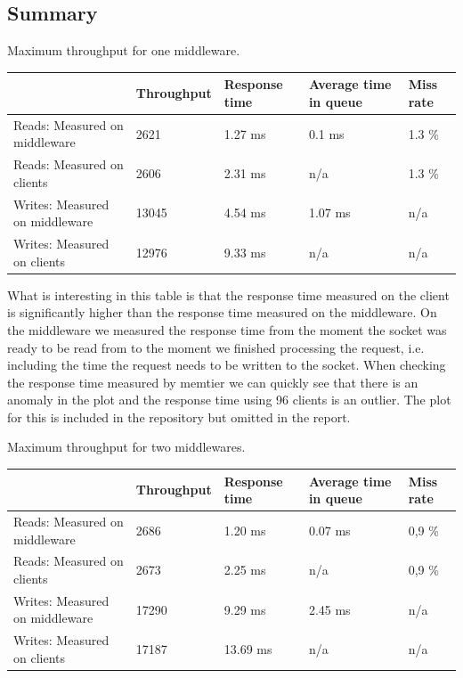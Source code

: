 \documentclass[11pt,a4paper]{article}
\begin{document}
\subsection{Summary}
%
\begin{center}
	{Maximum throughput for one middleware.}
	\begin{tabular}{|l|p{2cm}|p{2cm}|p{2cm}|p{2cm}|}
		\hline                                & Throughput & Response time & Average time in queue & Miss rate \\ 
		\hline Reads: Measured on middleware  &   2621     &     1.27 ms   &         0.1 ms        &   1.3 \%  \\ 
		\hline Reads: Measured on clients     &   2606     &     2.31 ms   & n/a                   &   1.3 \%  \\ 
		\hline Writes: Measured on middleware &  13045     &     4.54 ms   &         1.07 ms       & n/a       \\ 
		\hline Writes: Measured on clients    &  12976     &     9.33 ms   & n/a                   & n/a       \\ 
		\hline 
	\end{tabular}
\end{center}
%
What is interesting in this table is that the response time measured on the client is significantly higher than the response time measured on the middleware.
%
On the middleware we measured the response time from the moment the socket was ready to be read from to the moment we finished processing the request, i.e. including the time the request needs to be written to the socket.
%
When checking the response time measured by memtier we can quickly see that there is an anomaly in the plot and the response time using 96 clients is an outlier.
%
The plot for this is included in the repository but omitted in the report.
%
\begin{center}
	{Maximum throughput for two middlewares.}
	\begin{tabular}{|l|p{2cm}|p{2cm}|p{2cm}|p{2cm}|}
		\hline                                & Throughput & Response time & Average time in queue & Miss rate \\ 
		\hline Reads: Measured on middleware  &   2686     &     1.20 ms   &          0.07 ms      & 0,9 \%    \\ 
		\hline Reads: Measured on clients     &   2673     &     2.25 ms   & n/a                   & 0,9 \%    \\ 
		\hline Writes: Measured on middleware &   17290    &     9.29 ms   &           2.45 ms     & n/a       \\ 
		\hline Writes: Measured on clients    &   17187    &     13.69 ms  & n/a                   & n/a       \\ 
		\hline 
	\end{tabular}
\end{center}
\end{document}
